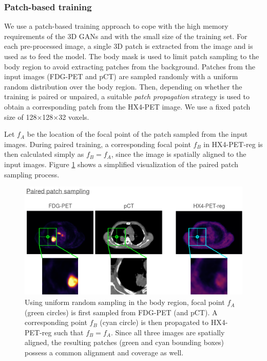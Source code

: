 \subsubsection{Patch-based training}
We use a patch-based training approach to cope with the high memory requirements of the 3D GANs and with the small size of the training set. For each pre-processed image, a single 3D patch is extracted from the image and is used as to feed the model. The body mask is used to limit patch sampling to the body region to avoid extracting patches from the background. Patches from the input images (FDG-PET and pCT) are sampled randomly with a uniform random distribution over the body region. Then, depending on whether the training is paired or unpaired, a suitable \textit{patch propagation} strategy is used to obtain a corresponding patch from the HX4-PET image. We use a fixed patch size of 128$\times$128$\times$32 voxels. 

Let $f_A$ be the location of the focal point of the patch sampled from the input images. During paired training, a corresponding focal point $f_B$ in HX4-PET-reg is then calculated simply as $f_B = f_A$, since the image is spatially aligned to the input images. Figure \ref{fig:paired_patch_sampling} shows a simplified visualization of the paired patch sampling process.

\begin{figure}[h!]
    \centering
    \includegraphics[width=\linewidth]{figures/Data/patch_sampling/paired_patch_sampling.png}
    \caption{Using uniform random sampling in the body region, focal point $f_A$ (green circles) is first sampled from FDG-PET (and pCT). A corresponding point $f_B$ (cyan circle) is then propagated to HX4-PET-reg such that $f_B = f_A$. Since all three images are spatially aligned, the resulting patches (green and cyan bounding boxes) possess a common alignment and coverage as well.}
    \label{fig:paired_patch_sampling}
\end{figure}

